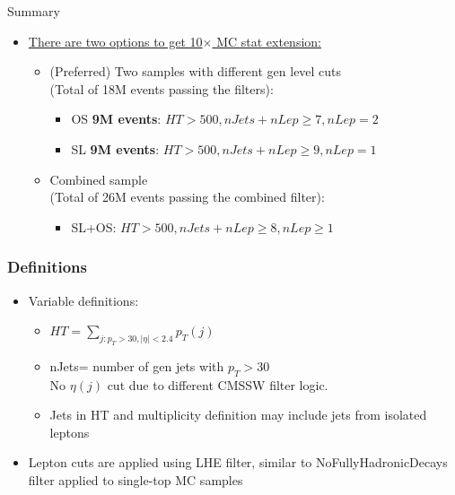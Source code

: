 \documentclass{beamer}
\begin{document}
\begin{frame}{Summary}
\begin{itemize}
\item \underline{There are two options to get 10$\times$ MC stat extension:}
\begin{itemize}
\item (Preferred) Two samples with different gen level cuts\\ (Total of 18M events passing the filters):
\begin{itemize}
\item OS \textbf{9M events}: $HT>500, nJets+nLep\geq7, nLep=2$
\item SL \textbf{9M events}: $HT>500, nJets+nLep\geq9, nLep=1$
\end{itemize}
\item Combined sample\\ (Total of 26M events passing the combined filter):
\begin{itemize}
\item SL+OS: $HT>500, nJets+nLep\geq8, nLep\geq1$
\end{itemize}
\end{itemize}
\end{itemize}
\end{frame}

\begin{frame}[label=newsample2]
\frametitle{Definitions}

\begin{itemize}
\item Variable definitions:
\begin{itemize}
\item $HT=\sum\limits_{j:p_T>30,|\eta|<2.4} {p_T(j)}$
\item nJets= number of gen jets with $p_T>30$\\
No $\eta(j)$ cut due to different CMSSW filter logic.
\item Jets in HT and multiplicity definition may include jets from isolated leptons
\end{itemize}
\item Lepton cuts are applied using LHE filter, similar to NoFullyHadronicDecays filter applied to single-top MC samples
\end{itemize}

\end{frame}

\end{document}
